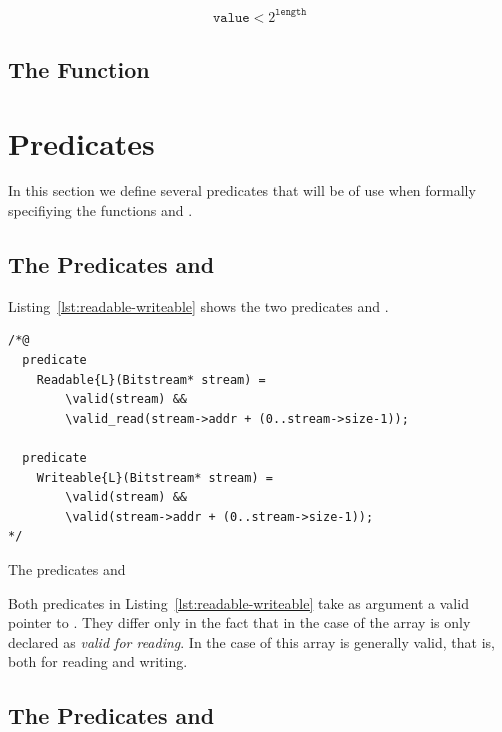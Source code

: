 \begin{align}
\label{eq:bit-stream-write-pre}
    \mathtt{value} < 2^{\mathtt{length}}
\end{align}

\subsection{The Function }


\section{Predicates}

In this section we define several \acsl predicates that will be of use when
formally specifiying the functions \bitstreamread and \bitstreamwrite.


\subsection{The Predicates \readable and \writeable}

Listing~\ref{lst:readable-writeable} shows the two predicates \readable and \writeable.

\begin{listing}[hbt]
\begin{lstlisting}[style=acsl-block]
/*@
  predicate 
    Readable{L}(Bitstream* stream) =
        \valid(stream) &&
        \valid_read(stream->addr + (0..stream->size-1));

  predicate
    Writeable{L}(Bitstream* stream) =
        \valid(stream) &&
        \valid(stream->addr + (0..stream->size-1));
*/
\end{lstlisting}
\caption{\label{lst:readable-writeable} The predicates \readable and \writeable}
\end{listing}

Both predicates in Listing~\ref{lst:readable-writeable}
take as argument a valid pointer to \bitstream.
They differ only in the fact that in the case of \readable
the array  is only declared as \emph{valid for reading}.
In the case of \writeable this array is generally valid, that is, both for reading and writing.

\subsection{The Predicates \invariant and \normal}

